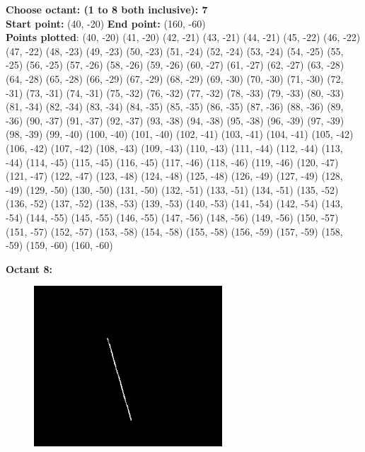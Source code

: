 \documentclass[12pt,letterpaper]{article}
\begin{document}
\textbf{Choose octant: (1 to 8 both inclusive): 7}\\
\textbf{Start point:} (40, -20)
\textbf{End point:} (160, -60)\\
\textbf{Points plotted}:
(40, -20) (41, -20) (42, -21) (43, -21) 
(44, -21) (45, -22) (46, -22) (47, -22) 
(48, -23) (49, -23) (50, -23) (51, -24) 
(52, -24) (53, -24) (54, -25) (55, -25) 
(56, -25) (57, -26) (58, -26) (59, -26) 
(60, -27) (61, -27) (62, -27) (63, -28) 
(64, -28) (65, -28) (66, -29) (67, -29) 
(68, -29) (69, -30) (70, -30) (71, -30) 
(72, -31) (73, -31) (74, -31) (75, -32) 
(76, -32) (77, -32) (78, -33) (79, -33) 
(80, -33) (81, -34) (82, -34) (83, -34) 
(84, -35) (85, -35) (86, -35) (87, -36) 
(88, -36) (89, -36) (90, -37) (91, -37) 
(92, -37) (93, -38) (94, -38) (95, -38) 
(96, -39) (97, -39) (98, -39) (99, -40) 
(100, -40) (101, -40) (102, -41) (103, -41) 
(104, -41) (105, -42) (106, -42) (107, -42) 
(108, -43) (109, -43) (110, -43) (111, -44) 
(112, -44) (113, -44) (114, -45) (115, -45) 
(116, -45) (117, -46) (118, -46) (119, -46) 
(120, -47) (121, -47) (122, -47) (123, -48) 
(124, -48) (125, -48) (126, -49) (127, -49) 
(128, -49) (129, -50) (130, -50) (131, -50) 
(132, -51) (133, -51) (134, -51) (135, -52) 
(136, -52) (137, -52) (138, -53) (139, -53) 
(140, -53) (141, -54) (142, -54) (143, -54) 
(144, -55) (145, -55) (146, -55) (147, -56) 
(148, -56) (149, -56) (150, -57) (151, -57) 
(152, -57) (153, -58) (154, -58) (155, -58) 
(156, -59) (157, -59) (158, -59) (159, -60) 
(160, -60) 

\newpage
\textbf{Octant 8:}
\begin{figure}[h]
    \centering
    \includegraphics[height=6cm]{Outputs/O8-1.png}
\end{figure}
\end{document}
